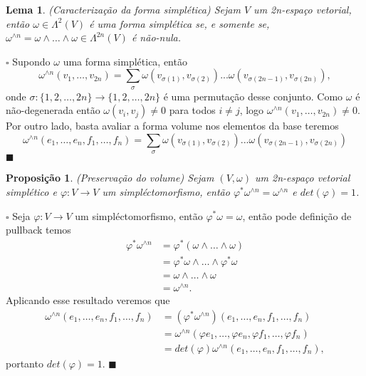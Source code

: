 \documentclass[12pt]{book}
\newtheorem{lema}[teorema]{Lema}
\newtheorem{proposicao}[teorema]{Proposição}
\newenvironment{prova}[1]{$\square$ #1}{\hfill$\blacksquare$}
\newcommand{\vermelho}[1]{{\color{red}#1}}
\begin{document}
	
	\begin{lema}
		(Caracterização da forma simplética) Sejam $V$ um 2n-espaço vetorial, então $\omega \in \Lambda^{2}(V)$ é uma forma simplética se, e somente se, $\omega^{\wedge n} = \omega\wedge \dots \wedge \omega \in \Lambda^{2n}(V)$ é não-nula.
	\end{lema}
	\begin{prova}
		\vermelho{Supondo $\omega$ uma forma simplética, então 
			$$
			\omega^{\wedge n}(v_{1}, \dots, v_{2n}) =\sum_{\sigma} \omega(v_{\sigma(1)}, v_{\sigma(2)})...\omega(v_{\sigma(2n-1)}, v_{\sigma(2n)}),
			$$
			onde $\sigma:\{1, 2, \dots , 2n\} \to \{1, 2, \dots , 2n\}$ é uma permutação desse conjunto. Como $\omega$ é não-degenerada então $\omega(v_{i}, v_{j}) \neq 0 $ para todos $i \neq j$, logo $\omega^{\wedge n}(v_{1}, \dots, v_{2n}) \neq 0$. Por outro lado, basta avaliar a forma volume nos elementos da base teremos 
			$$
			\omega^{\wedge n}(e_{1}, \dots, e_{n}, f_{1},\dots, f_{n}) = \sum_{\sigma} \omega(v_{\sigma(1)}, v_{\sigma(2)})...\omega(v_{\sigma(2n-1)}, v_{\sigma(2n)})
			$$}
	\end{prova}
	
	\begin{proposicao}\label{proposicao_preservacao_volume}
		(Preservação do volume) Sejam $(V,\omega)$ um 2n-espaço vetorial simplético e $\varphi:V\to V$ um simpléctomorfismo, então $\varphi^{*}\omega^{\wedge n}=\omega^{\wedge n}$ e $det(\varphi)=1$.
	\end{proposicao}
	\begin{prova}
		Seja $\varphi:V \to V$ um simpléctomorfismo, então $\varphi^{*}\omega = \omega$, então pode definição de pullback temos
		$$
		\begin{aligned}
			\varphi^{*}\omega^{\wedge n} 
			&= 
			\varphi^{*}(\omega\wedge \dots \wedge\omega) 
			\\
			&= \varphi^{*}\omega\wedge \dots \wedge\varphi^{*}\omega
			\\
			&=\omega\wedge \dots \wedge \omega 
			\\
			&= \omega^{\wedge n}.
		\end{aligned} 
		$$
		Aplicando esse resultado veremos que
		$$
		\begin{aligned}
		\omega^{\wedge n}(e_{1}, \dots,e_{n}, f_{1},\dots, f_{n})
		&=(\varphi^{*}\omega^{\wedge n})(e_{1}, \dots, e_{n}, f_{1},\dots, f_{n})
		\\
		&=
		\omega^{\wedge n}(\varphi e_{1}, \dots,\varphi  e_{n}, \varphi f_{1},\dots, \varphi f_{n})
		\\
		&=det(\varphi)\omega^{\wedge n}(e_{1}, \dots, e_{n}, f_{1},\dots, f_{n}),
		\end{aligned}
		$$
		portanto $det(\varphi) = 1$.
	\end{prova}
	
\end{document}
